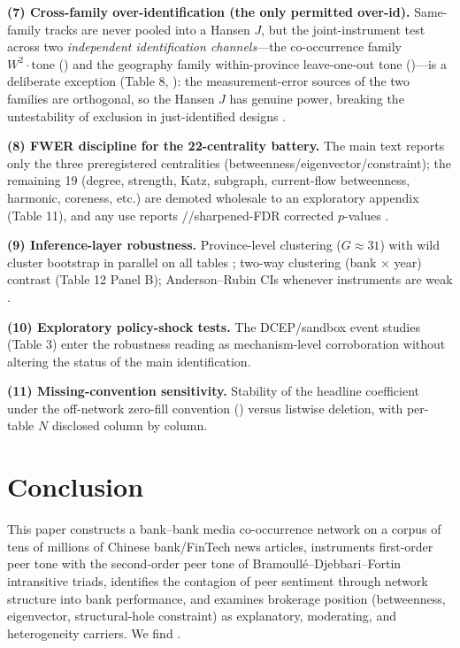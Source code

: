 \textbf{(7) Cross-family over-identification (the only permitted
over-id).} Same-family tracks are never pooled into a Hansen $J$,
but the joint-instrument test across two \emph{independent
identification channels}---the co-occurrence family
$W^{2}\cdot\text{tone}$ () and the
geography family within-province leave-one-out tone
()---is a deliberate exception
(Table 8, ): the measurement-error sources of the
two families are orthogonal, so the Hansen $J$ has genuine power,
breaking the untestability of exclusion in just-identified designs
\parencite{leary2014peer,goldsmith2020bartik,gabaix2024granular,borusyak2025practical}.

\textbf{(8) FWER discipline for the 22-centrality battery.} The
main text reports only the three preregistered centralities
(betweenness/eigenvector/constraint); the remaining 19 (degree,
strength, Katz, subgraph, current-flow betweenness, harmonic,
coreness, etc.) are demoted wholesale to an exploratory appendix
(Table 11), and any use reports
//sharpened-FDR corrected $p$-values
\parencite{romano2005stepwise}.

\textbf{(9) Inference-layer robustness.} Province-level clustering
($G \approx 31$) with wild cluster bootstrap in parallel on all
tables \parencite{roodman2019fast}; two-way clustering (bank
$\times$ year) contrast (Table 12 Panel B); Anderson--Rubin CIs
whenever instruments are weak \parencite{andrews2019weak}.

\textbf{(10) Exploratory policy-shock tests.} The DCEP/sandbox
event studies (Table 3) enter the robustness reading as
mechanism-level corroboration without altering the status of the
main identification.

\textbf{(11) Missing-convention sensitivity.} Stability of the
headline coefficient under the off-network zero-fill convention
() versus listwise
deletion, with per-table $N$ disclosed column by column.


\section{Conclusion}\label{sec:concl}

This paper constructs a bank--bank media co-occurrence network on a
corpus of tens of millions of Chinese bank/FinTech news articles,
instruments first-order peer tone with the second-order peer tone of
Bramoull\'e--Djebbari--Fortin intransitive triads, identifies the
contagion of peer sentiment through network structure into bank
performance, and examines brokerage position (betweenness,
eigenvector, structural-hole constraint) as explanatory, moderating,
and heterogeneity carriers. We find .

